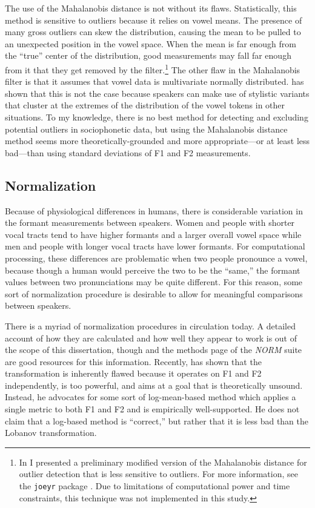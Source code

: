 The use of the Mahalanobis distance is not without its flaws. Statistically, this method is sensitive to outliers because it relies on vowel means. The presence of many gross outliers can skew the distribution, causing the mean to be pulled to an unexpected position in the vowel space. When the mean is far enough from the ``true'' center of the distribution, good measurements may fall far enough from it that they get removed by the filter.\footnote{In \citet{stanley_2018_mistplots} I presented a preliminary modified version of the Mahalanobis distance for outlier detection that is less sensitive to outliers. For more information, see the \texttt{joeyr} package \citep{joey_2020_joeyr}. Due to limitations of computational power and time constraints, this technique was not implemented in this study. } The other flaw in the Mahalanobis filter is that it assumes that vowel data is multivariate normally distributed. \citet{vanhofwegen_2017_diss} has shown that this is not the case because speakers can make use of stylistic variants that cluster at the extremes of the distribution of the vowel tokens in other situations. To my knowledge, there is no best method for detecting and excluding potential outliers in sociophonetic data, but using the Mahalanobis distance method seems more theoretically-grounded and more appropriate---or at least less bad---than using standard deviations of F1 and F2 measurements.


\subsection{Normalization}
\label{normalization}

Because of physiological differences in humans, there is considerable variation in the formant measurements between speakers. Women and people with shorter vocal tracts tend to have higher formants and a larger overall vowel space while men and people with longer vocal tracts have lower formants. For computational processing, these differences are problematic when two people pronounce a vowel, because though a human would perceive the two to be the ``same,'' the formant values between two pronunciations may be quite different. For this reason, some sort of normalization procedure is desirable to allow for meaningful comparisons between speakers.

There is a myriad of normalization procedures in circulation today. A detailed account of how they are calculated and how well they appear to work is out of the scope of this dissertation, though \citet{adank_etal_2004} and the methods page of the \textit{NORM} suite \citep{thomas_kendall_2007_NORM} are good resources for this information. Recently, \citet{barreda_2019} has shown that the \citet{lobanov_1971} transformation is inherently flawed because it operates on F1 and F2 independently, is too powerful, and aims at a goal that is theoretically unsound. Instead, he advocates for some sort of log-mean-based method which applies a single metric to both F1 and F2 and is empirically well-supported. He does not claim that a log-based method is ``correct,'' but rather that it is less bad than the Lobanov transformation.

